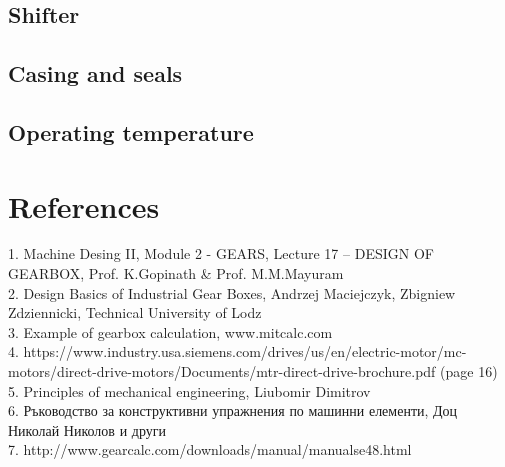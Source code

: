 \documentclass{article}
\begin{document}
\subsection{Shifter}
\subsection{Casing and seals}
\subsection{Operating temperature}

\section{References}
1. Machine Desing II, Module 2 - GEARS, Lecture 17 – DESIGN OF GEARBOX, Prof. K.Gopinath \& Prof. M.M.Mayuram \\
2. Design Basics of Industrial Gear Boxes, Andrzej Maciejczyk, Zbigniew Zdziennicki, Technical University of Lodz \\
3. Example of gearbox calculation, www.mitcalc.com \\
4. https://www.industry.usa.siemens.com/drives/us/en/electric-motor/mc-motors/direct-drive-motors/Documents/mtr-direct-drive-brochure.pdf  (page 16) \\
5. Principles of mechanical engineering, Liubomir Dimitrov  \\
6. Ръководство за конструктивни упражнения по машинни елементи, Доц Николай Николов и други  \\
7. http://www.gearcalc.com/downloads/manual/manualse48.html  \\

\tableofcontents
\end{document}
